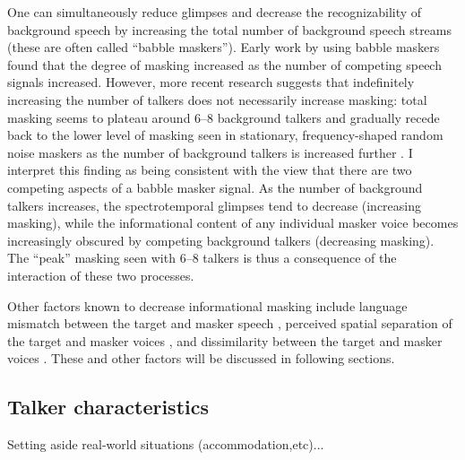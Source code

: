 One can simultaneously reduce glimpses and decrease the recognizability of background speech by increasing the total number of background speech streams (these are often called “babble maskers”).  Early work by \citet{Miller1947} using babble maskers found that the degree of masking increased as the number of competing speech signals increased.  However, more recent research suggests that indefinitely increasing the number of talkers does not necessarily increase masking: total masking seems to plateau around 6–8 background talkers and gradually recede back to the lower level of masking seen in stationary, frequency-shaped random noise maskers as the number of background talkers is increased further \citep{BrungartEtAl2001,SimpsonCooke2005}.  I interpret this finding as being consistent with the view that there are two competing aspects of a babble masker signal.  %
As the number of background talkers increases, the spectrotemporal glimpses tend to decrease (increasing masking), while the informational content of any individual masker voice becomes increasingly obscured by competing background talkers (decreasing masking).  The “peak” masking seen with 6–8 talkers is thus a consequence of the interaction of these two processes. 

Other factors known to decrease informational masking include language mismatch between the target and masker speech \citep{RhebergenEtAl2005, VanEngenBradlow2007, WuEtAl2011, BrouwerEtAl2012}, perceived spatial separation of the target and masker voices \citep{BrungartSimpson2002, FreymanEtAl1999, FreymanEtAl2004, KiddEtAl2005b, JohnstoneLitovsky2006}, and dissimilarity between the target and masker voices \citep{Brungart2001}.  These and other factors will be discussed in following sections.

	
\subsection{Talker characteristics}
Setting aside real-world situations (accommodation,etc)...

